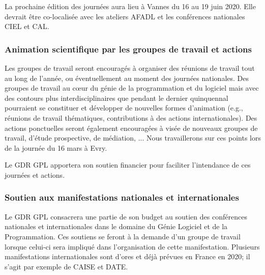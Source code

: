 \documentclass[11pt]{article}
\begin{document}
La prochaine édition des journées aura lieu à Vannes du 16 au 19 juin 2020. Elle devrait être co-localisée avec les ateliers AFADL et les conférences nationales CIEL et CAL.


\subsubsection{Animation scientifique par les groupes de travail et actions}

Les groupes de travail seront encouragés à organiser des réunions de travail
tout au long de l'année, ou éventuellement au moment des journées nationales. 
Des groupes de travail au c\oe{}ur du génie de la programmation et du logiciel mais avec des contours plus interdisciplinaires que pendant le dernier quinquennal pourraient se constituer et développer de nouvelles formes d'animation (e.g., réunions de travail thématiques, contributions à des actions internationales). 
Des actions ponctuelles seront également encouragées à visée de nouveaux groupes de travail, d'étude prospective, de médiation, ...
Nous travaillerons sur ces points lors de la journée du 16 mars à Evry. 

Le GDR GPL apportera son soutien financier pour faciliter l'intendance de ces journées et actions.

\subsubsection{Soutien aux manifestations nationales et internationales}

Le GDR GPL consacrera une partie de son budget au soutien des conférences
nationales et internationales dans le domaine du Génie Logiciel et de la
Programmation. Ces soutiens se feront à la demande d'un groupe de travail
lorsque celui-ci sera impliqué dans l'organisation de cette manifestation.
Plusieurs manifestations internationales sont d'ores et déjà prévues en France en 2020; il s'agit par exemple de CAISE et  DATE.
\end{document}

